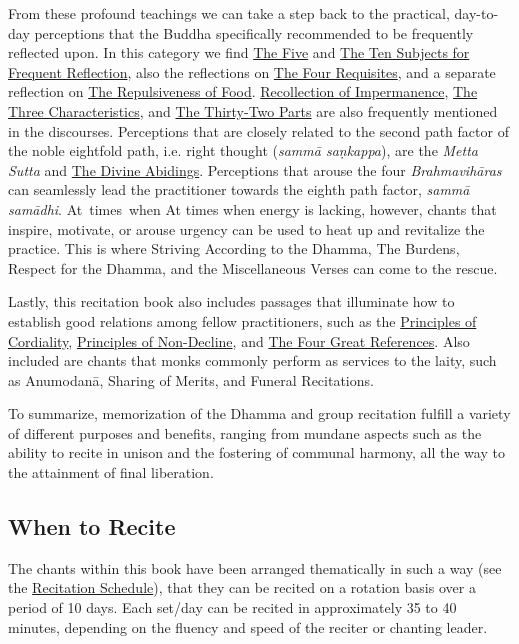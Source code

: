 From these profound teachings we can take a step back to the practical, day-to-day perceptions that the Buddha specifically recommended to be frequently reflected upon. In this category we find \hyperref[five-reflections]{The Five} and \hyperref[ten-reflections]{The Ten Subjects for Frequent Reflection}, also the reflections on \hyperref[four-requisites]{The Four Requisites}, and a separate reflection on \hyperref[repulsiveness-of-food]{The Repulsiveness of Food}. \hyperref[recollection-of-impermanence]{Recollection of Impermanence}, \hyperref[three-characteristics]{The Three Characteristics}, and \hyperref[32-parts]{The Thirty-Two Parts} are also frequently mentioned in the discourses. Perceptions that are closely related to the second path factor of the noble eightfold path, i.e. right thought (\textit{sammā saṇkappa}), are the \textit{Metta Sutta} and \hyperref[divine-abidings]{The Divine Abidings}. Perceptions that arouse the four \textit{Brahmavihāras} can seamlessly lead the practitioner towards the eighth path factor, \textit{sammā samādhi}. \ifninebythirteen \mbox{At times}~when \else At times when \fi energy is lacking, however, chants that inspire, motivate, or arouse urgency can be used to heat up and revitalize the practice. This is where Striving According to the Dhamma, The Burdens, Respect for the Dhamma, and the Miscellaneous Verses can come to the rescue.

Lastly, this recitation book also includes passages that illuminate how to establish good relations among fellow practitioners, such as the \hyperref[principles-of-cordiality]{Principles of Cordiality}, \hyperref[principles-of-non-decline]{Principles of Non-Decline}, and \hyperref[four-great-references]{The Four Great References}. Also included are chants that monks commonly perform as services to the laity, such as Anumodanā, Sharing of Merits, and Funeral Recitations.

To summarize, memorization of the Dhamma and group recitation fulfill a variety of different purposes and benefits, ranging from mundane aspects such as the ability to recite in unison and the fostering of communal harmony, all the way to the attainment of final liberation.

\subsection*{When to Recite}

The chants within this book have been arranged thematically in such a way (see the \hyperref[schedule]{Recitation Schedule}), that they can be recited on a rotation basis over a period of 10 days. Each set/day can be recited in approximately 35 to 40 minutes, depending on the fluency and speed of the reciter or chanting leader.

